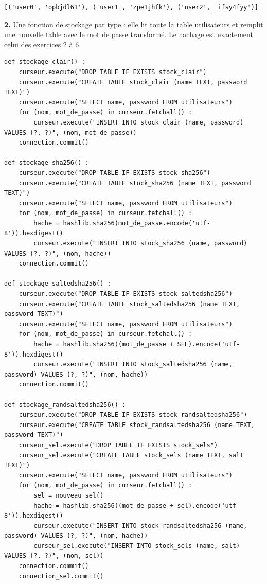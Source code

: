 \documentclass[11pt,a4paper]{article}
\newcommand{\code}[1]{\colorbox{fondcode}{\ttfamily\small #1}}
\begin{document}
\begin{lstlisting}[style=sortie]
[('user0', 'opbjdl61'), ('user1', 'zpe1jhfk'), ('user2', 'ifsy4fyy')]
\end{lstlisting}

\textbf{2.} Une fonction de stockage par type : elle lit toute la table \code{utilisateurs} et remplit une nouvelle table avec le mot de passe transformé. Le hachage est exactement celui des exercices 2 à 6.

\begin{lstlisting}
def stockage_clair() :
    curseur.execute("DROP TABLE IF EXISTS stock_clair")
    curseur.execute("CREATE TABLE stock_clair (name TEXT, password TEXT)")
    curseur.execute("SELECT name, password FROM utilisateurs")
    for (nom, mot_de_passe) in curseur.fetchall() :
        curseur.execute("INSERT INTO stock_clair (name, password) VALUES (?, ?)", (nom, mot_de_passe))
    connection.commit()

def stockage_sha256() :
    curseur.execute("DROP TABLE IF EXISTS stock_sha256")
    curseur.execute("CREATE TABLE stock_sha256 (name TEXT, password TEXT)")
    curseur.execute("SELECT name, password FROM utilisateurs")
    for (nom, mot_de_passe) in curseur.fetchall() :
        hache = hashlib.sha256(mot_de_passe.encode('utf-8')).hexdigest()
        curseur.execute("INSERT INTO stock_sha256 (name, password) VALUES (?, ?)", (nom, hache))
    connection.commit()

def stockage_saltedsha256() :
    curseur.execute("DROP TABLE IF EXISTS stock_saltedsha256")
    curseur.execute("CREATE TABLE stock_saltedsha256 (name TEXT, password TEXT)")
    curseur.execute("SELECT name, password FROM utilisateurs")
    for (nom, mot_de_passe) in curseur.fetchall() :
        hache = hashlib.sha256((mot_de_passe + SEL).encode('utf-8')).hexdigest()
        curseur.execute("INSERT INTO stock_saltedsha256 (name, password) VALUES (?, ?)", (nom, hache))
    connection.commit()

def stockage_randsaltedsha256() :
    curseur.execute("DROP TABLE IF EXISTS stock_randsaltedsha256")
    curseur.execute("CREATE TABLE stock_randsaltedsha256 (name TEXT, password TEXT)")
    curseur_sel.execute("DROP TABLE IF EXISTS stock_sels")
    curseur_sel.execute("CREATE TABLE stock_sels (name TEXT, salt TEXT)")
    curseur.execute("SELECT name, password FROM utilisateurs")
    for (nom, mot_de_passe) in curseur.fetchall() :
        sel = nouveau_sel()
        hache = hashlib.sha256((mot_de_passe + sel).encode('utf-8')).hexdigest()
        curseur.execute("INSERT INTO stock_randsaltedsha256 (name, password) VALUES (?, ?)", (nom, hache))
        curseur_sel.execute("INSERT INTO stock_sels (name, salt) VALUES (?, ?)", (nom, sel))
    connection.commit()
    connection_sel.commit()


\end{lstlisting}
\end{document}
